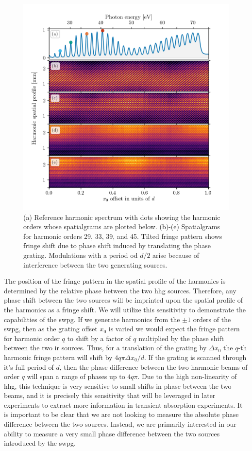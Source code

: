 \begin{figure}
	\centering
	\includegraphics[width=1.0\textwidth]{figures/Two_source/harmonic_spatialgrams.png}
	\caption{(a) Reference harmonic spectrum with dots showing the harmonic orders whose spatialgrams are plotted below. (b)-(e) Spatialgrams for harmonic orders 29, 33, 39, and 45.  Tilted fringe pattern shows fringe shift due to phase shift induced by translating the phase grating. Modulations with a period od $d/2$ arise because of interference between the two generating sources.}
	\label{fig:harmonic_spatialgrams}
\end{figure}

The position of the fringe pattern in the spatial profile of the harmonics is determined by the relative phase between the two \gls{hhg} sources.  Therefore, any phase shift between the two sources will be imprinted upon the spatial profile of the harmonics as a fringe shift.  We will utilize this sensitivity to demonstrate the capabilities of the \gls{swpg}.  If we generate harmonics from the $\pm1$ orders of the \gls{swpg}, then as the grating offset $x_0$ is varied we would expect the fringe pattern for harmonic order $q$ to shift by a factor of $q$ multiplied by the phase shift between the two \gls{ir} sources. Thus, for a translation of the grating by $\Delta x_0$ the $q$-th harmonic fringe pattern will shift by $4q\pi\Delta x_0/d$.  If the grating is scanned through it's full period of $d$, then the phase difference between the two harmonic beams of order $q$ will span a range of phases up to $4q\pi$.  Due to the high  non-linearity of \gls{hhg}, this technique is very sensitive to small shifts in phase between the two beams, and it is precisely this sensitivity that will be leveraged in later experiments to extract more information in transient absorption experiments.  It is important to be clear that we are not looking to measure the absolute phase difference between the two sources.  Instead, we are primarily interested in our ability to measure a very small phase difference between the two sources introduced by the \gls{swpg}.

